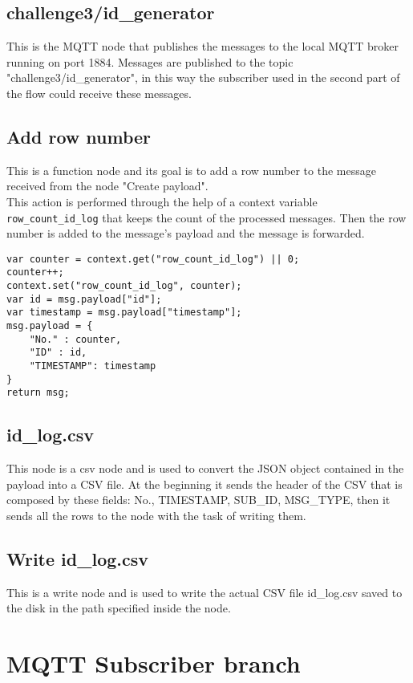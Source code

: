 \subsection{challenge3/id\_generator}
This is the MQTT node that publishes the messages to the local MQTT broker running on port 1884. Messages are published to the topic "challenge3/id\_generator", in this way the subscriber used in the second part of the flow could receive these messages.

\subsection{Add row number}
This is a function node and its goal is to add a row number to the message received from the node "Create payload".\\
This action is performed through the help of a context variable \verb|row_count_id_log| that keeps the count of the processed messages.
Then the row number is added to the message's payload and the message is forwarded.

\begin{verbatim}
var counter = context.get("row_count_id_log") || 0;
counter++;
context.set("row_count_id_log", counter);
var id = msg.payload["id"];
var timestamp = msg.payload["timestamp"];
msg.payload = {
    "No." : counter,
    "ID" : id,
    "TIMESTAMP": timestamp
}
return msg;
\end{verbatim}

\subsection{id\_log.csv}
This node is a csv node and is used to convert the JSON object contained in the payload into a CSV file.
At the beginning it sends the header of the CSV that is composed by these fields: No., TIMESTAMP, SUB\_ID, MSG\_TYPE, then it sends all the rows to the node with the task of writing them.

\subsection{Write id\_log.csv}
This is a write node and is used to write the actual CSV file id\_log.csv saved to the disk in the path specified inside the node.

\section{MQTT Subscriber branch}
\label{sec:subscriber_branch}


